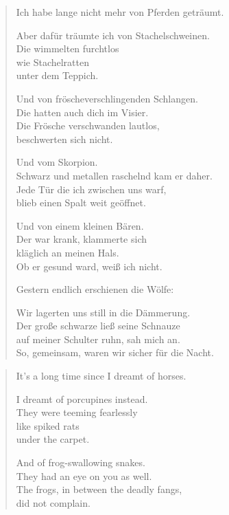 
{\setlength{\stanzaskip}{0.5em}

\cleartoverso


\begin{verse}
Ich habe lange nicht mehr von Pferden geträumt.

Aber dafür träumte ich von Stachelschweinen.\\
Die wimmelten furchtlos\\
wie Stachelratten\\
unter dem Teppich.

Und von fröscheverschlingenden Schlangen.\\
Die hatten auch dich im Visier.\\
Die Frösche verschwanden lautlos,\\
beschwerten sich nicht.

Und vom Skorpion.\\
Schwarz und metallen raschelnd kam er daher.\\
Jede Tür die ich zwischen uns warf,\\
blieb einen Spalt weit geöffnet.

Und von einem kleinen Bären.\\
Der war krank, klammerte sich\\
kläglich an meinen Hals.\\
Ob er gesund ward, weiß ich nicht.

Gestern endlich erschienen die Wölfe:

Wir lagerten uns still in die Dämmerung.\\
Der große schwarze ließ seine Schnauze\\
auf meiner Schulter ruhn, sah mich an.\\
So, gemeinsam, waren wir sicher für die Nacht.
\end{verse}

\cleartorecto


\begin{verse}
It's a long time since I dreamt of horses.

I dreamt of porcupines instead.\\
They were teeming fearlessly\\
like spiked rats\\
under the carpet.

And of frog-swallowing snakes.\\
They had an eye on you as well.\\
The frogs, in between the deadly fangs,\\
did not complain.


\end{verse}}
